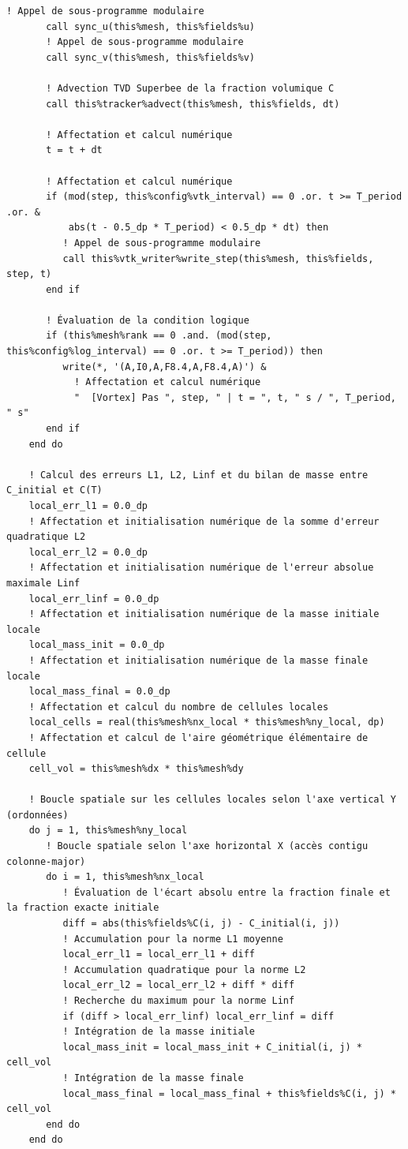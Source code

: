 \documentclass[10pt,a4paper,oneside]{book}
\begin{document}
\begin{lstlisting}[language={[95]Fortran}]
       ! Appel de sous-programme modulaire
       call sync_u(this%mesh, this%fields%u)
       ! Appel de sous-programme modulaire
       call sync_v(this%mesh, this%fields%v)

       ! Advection TVD Superbee de la fraction volumique C
       call this%tracker%advect(this%mesh, this%fields, dt)

       ! Affectation et calcul numérique
       t = t + dt

       ! Affectation et calcul numérique
       if (mod(step, this%config%vtk_interval) == 0 .or. t >= T_period .or. &
           abs(t - 0.5_dp * T_period) < 0.5_dp * dt) then
          ! Appel de sous-programme modulaire
          call this%vtk_writer%write_step(this%mesh, this%fields, step, t)
       end if

       ! Évaluation de la condition logique
       if (this%mesh%rank == 0 .and. (mod(step, this%config%log_interval) == 0 .or. t >= T_period)) then
          write(*, '(A,I0,A,F8.4,A,F8.4,A)') &
            ! Affectation et calcul numérique
            "  [Vortex] Pas ", step, " | t = ", t, " s / ", T_period, " s"
       end if
    end do

    ! Calcul des erreurs L1, L2, Linf et du bilan de masse entre C_initial et C(T)
    local_err_l1 = 0.0_dp
    ! Affectation et initialisation numérique de la somme d'erreur quadratique L2
    local_err_l2 = 0.0_dp
    ! Affectation et initialisation numérique de l'erreur absolue maximale Linf
    local_err_linf = 0.0_dp
    ! Affectation et initialisation numérique de la masse initiale locale
    local_mass_init = 0.0_dp
    ! Affectation et initialisation numérique de la masse finale locale
    local_mass_final = 0.0_dp
    ! Affectation et calcul du nombre de cellules locales
    local_cells = real(this%mesh%nx_local * this%mesh%ny_local, dp)
    ! Affectation et calcul de l'aire géométrique élémentaire de cellule
    cell_vol = this%mesh%dx * this%mesh%dy

    ! Boucle spatiale sur les cellules locales selon l'axe vertical Y (ordonnées)
    do j = 1, this%mesh%ny_local
       ! Boucle spatiale selon l'axe horizontal X (accès contigu colonne-major)
       do i = 1, this%mesh%nx_local
          ! Évaluation de l'écart absolu entre la fraction finale et la fraction exacte initiale
          diff = abs(this%fields%C(i, j) - C_initial(i, j))
          ! Accumulation pour la norme L1 moyenne
          local_err_l1 = local_err_l1 + diff
          ! Accumulation quadratique pour la norme L2
          local_err_l2 = local_err_l2 + diff * diff
          ! Recherche du maximum pour la norme Linf
          if (diff > local_err_linf) local_err_linf = diff
          ! Intégration de la masse initiale
          local_mass_init = local_mass_init + C_initial(i, j) * cell_vol
          ! Intégration de la masse finale
          local_mass_final = local_mass_final + this%fields%C(i, j) * cell_vol
       end do
    end do


\end{lstlisting}
\end{document}
